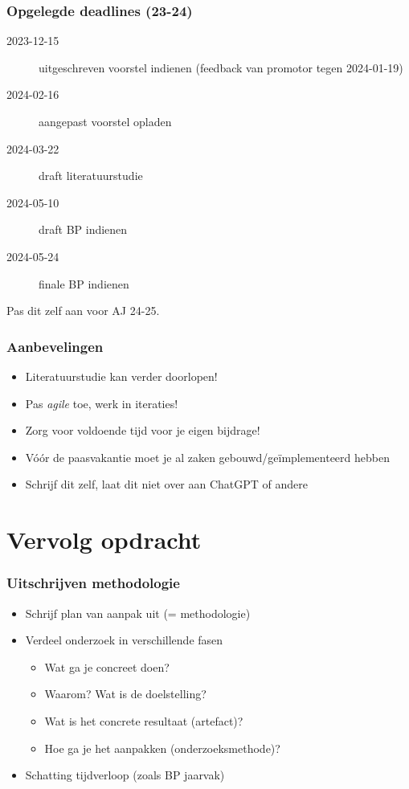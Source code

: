 \documentclass[aspectratio=169]{beamer}
\begin{document}
\begin{frame}
  \frametitle{Opgelegde deadlines (23-24)}

  \begin{description}
    \item[2023-12-15] uitgeschreven voorstel indienen (feedback van promotor tegen 2024-01-19)
    \item[2024-02-16] aangepast voorstel opladen
    \item[2024-03-22] draft literatuurstudie
    \item[2024-05-10] draft BP indienen
    \item[2024-05-24] finale BP indienen
  \end{description}

  \medskip

  Pas dit zelf aan voor AJ 24-25.

\end{frame}

\begin{frame}
  \frametitle{Aanbevelingen}

  \begin{itemize}
    \item Literatuurstudie kan verder doorlopen!
    \item Pas \textit{agile} toe, werk in iteraties!
    \item Zorg voor voldoende tijd voor je eigen bijdrage!
    \item Vóór de paasvakantie moet je al zaken gebouwd/geïmplementeerd hebben
    \item Schrijf dit zelf, laat dit niet over aan ChatGPT of andere
  \end{itemize}

\end{frame}

\section{Vervolg opdracht}

\begin{frame}
  \frametitle{Uitschrijven methodologie}

  \begin{itemize}
    \item Schrijf plan van aanpak uit (= methodologie)
    \item Verdeel onderzoek in verschillende fasen
          \begin{itemize}
            \item Wat ga je concreet doen?
            \item Waarom? Wat is de doelstelling?
            \item Wat is het concrete resultaat (artefact)?
            \item Hoe ga je het aanpakken (onderzoeksmethode)?
          \end{itemize}
    \item Schatting tijdverloop (zoals BP jaarvak)
  \end{itemize}

\end{frame}
\end{document}
